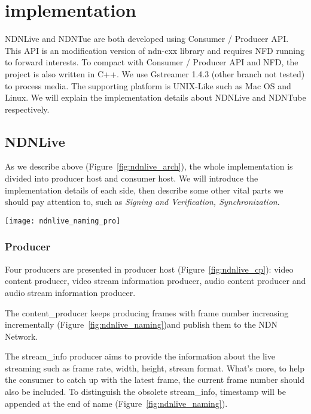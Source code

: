 \section{implementation} %
\label{sec:implementation}
NDNLive and NDNTue are both developed using Consumer / Producer API. This API is an modification version of ndn-cxx library and requires NFD running to forward interests. To compact with Consumer / Producer API and NFD, the project is also written in C++. We use Gstreamer 1.4.3 (other branch not tested) to process media. The supporting platform is UNIX-Like such as Mac OS and Linux. We will explain the implementation details about NDNLive and NDNTube respectively.

\subsection{NDNLive}
As we describe above (Figure~\ref{fig:ndnlive_arch}), the whole implementation is divided into producer host and consumer host. We will introduce the implementation details of each side, then describe some other vital parts we should pay attention to, such as \textit{Signing and Verification, Synchronization}. 
\begin{figure*}%
  \centering
  \texttt{[image: ndnlive\_naming\_pro]}
  \caption{NDNLive Producer and Consumer Structure}
  \label{fig:ndnlive_cp}
\end{figure*}

\subsubsection{Producer}
\label{ssub:ndnlive_pro}
Four producers are presented in producer host (Figure~\ref{fig:ndnlive_cp}): video content producer, video stream information producer, audio content producer and audio stream information producer. 

The content\_producer keeps producing frames with frame number increasing incrementally (Figure~\ref{fig:ndnlive_naming})and publish them to the NDN Network. 

The stream\_info producer aims to provide the information about the live streaming such as frame rate, width, height, stream format. What's more, to help the consumer to catch up with the latest frame, the current frame number should also be included. To distinguish the obsolete stream\_info, timestamp will be appended at the end of name (Figure~\ref{fig:ndnlive_naming}).

